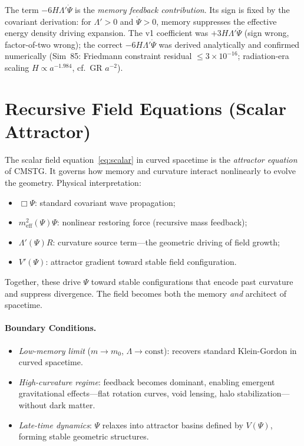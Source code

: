 \documentclass[12pt,a4paper]{article}
\begin{document}
The term $-6H\Lambda'\dot\Psi$ is the \emph{memory feedback contribution}. Its sign
is fixed by the covariant derivation: for $\Lambda' > 0$ and $\dot\Psi > 0$, memory
suppresses the effective energy density driving expansion. The v1 coefficient was
$+3H\Lambda'\dot\Psi$ (sign wrong, factor-of-two wrong); the correct
$-6H\Lambda'\dot\Psi$ was derived analytically and confirmed numerically
(Sim~85: Friedmann constraint residual $\leq 3\times 10^{-16}$;
radiation-era scaling $H\propto a^{-1.984}$, cf.\ GR $a^{-2}$).

\section{Recursive Field Equations (Scalar Attractor)}
\label{sec:attractor}

The scalar field equation~\eqref{eq:scalar} in curved spacetime is the
\emph{attractor equation} of CMSTG. It governs how memory and curvature
interact nonlinearly to evolve the geometry. Physical interpretation:
\begin{itemize}
  \item $\Box\Psi$: standard covariant wave propagation;
  \item $m_{\mathrm{eff}}^2(\Psi)\Psi$: nonlinear restoring force (recursive mass feedback);
  \item $\Lambda'(\Psi)R$: curvature source term---the geometric driving of field growth;
  \item $V'(\Psi)$: attractor gradient toward stable field configuration.
\end{itemize}
Together, these drive $\Psi$ toward stable configurations that encode past
curvature and suppress divergence. The field becomes both the memory
\emph{and} architect of spacetime.

\paragraph{Boundary Conditions.}
\begin{itemize}
  \item \emph{Low-memory limit} ($m \to m_0$, $\Lambda \to \mathrm{const}$): recovers standard Klein-Gordon in curved spacetime.
  \item \emph{High-curvature regime}: feedback becomes dominant, enabling emergent gravitational effects---flat rotation curves, void lensing, halo stabilization---without dark matter.
  \item \emph{Late-time dynamics}: $\Psi$ relaxes into attractor basins defined by $V(\Psi)$, forming stable geometric structures.
\end{itemize}
\end{document}
